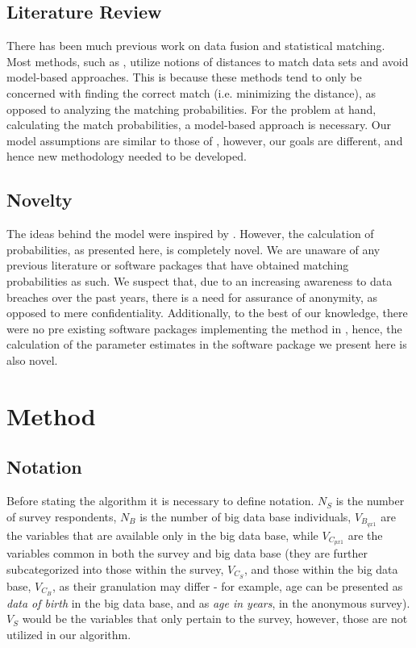 \subsection{Literature Review}
 There has been much previous work on data fusion and statistical matching. Most methods, such as \cite{RefWorks:98}, utilize notions of distances to match data sets and avoid model-based approaches. This is because these methods tend to only be concerned with finding the correct match (i.e. minimizing the distance), as opposed to analyzing the matching probabilities. For the problem at hand, calculating the match probabilities, a model-based approach is necessary. Our model assumptions are similar to those of \cite{RefWorks:30}, however, our goals are different, and hence new methodology needed to be developed.


\subsection{Novelty}
The ideas behind the model were inspired by \cite{RefWorks:30}. However, the calculation of probabilities, as presented here, is completely novel. We are unaware of any previous literature or software packages that have obtained matching probabilities as such. We suspect that, due to an increasing awareness to data breaches over the past years, there is a need for assurance of anonymity, as opposed to mere confidentiality.
Additionally, to the best of our knowledge, there were no pre existing software packages implementing the method in \cite{RefWorks:97}, hence, the calculation of the parameter estimates in the software package we present here is also novel.\


\section{Method}

\subsection{Notation}
Before stating the algorithm it is necessary to define notation. $N_S$ is the number of survey respondents, $N_B$ is the number of big data base individuals, $V_{B_{qx1}}$ are the variables that are available only in the big data base, while $V_{C_{px1}} $ are the variables common in both the survey and big data base (they are further subcategorized into those within the survey, $V_{C_{S}}$, and those within the big data base, $V_{C_{B}}$, as their granulation may differ - for example, age can be presented as \textit{data of birth} in the big data base, and as \textit{age in years}, in the anonymous survey).  $V_S$ would be the variables that only pertain to the survey, however, those are not utilized in our algorithm.

